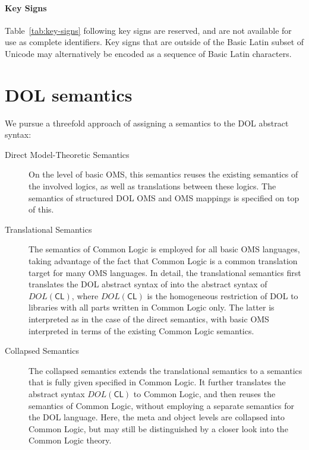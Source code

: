 \documentclass[10pt,%
\ifpretendfinal
final%
\else
draft%
\fi,
]{scrreprt}
\newcommand*{\CL}{\ensuremath{\mathsf{CL}}\xspace}
\newcommand{\clause}[1]{\chapter{#1}}
\newcommand{\sssclause}[1]{\subsubsection{#1}}
\begin{document}
\sssclause{Key Signs}

Table~\ref{tab:key-signs} following key signs are reserved, and are not available for use as complete identifiers.  Key signs that are outside of the Basic Latin subset of Unicode may alternatively be encoded as a sequence of Basic Latin characters.


\clause{DOL semantics}\label{c:semantics}

We pursue a threefold approach of assigning a semantics to the DOL
abstract syntax:

\begin{description}
\item[Direct Model-Theoretic Semantics] On the level of basic
  OMS, this semantics reuses the existing semantics of the
  involved logics, as well as translations between these logics.  The
  semantics of structured DOL OMS and OMS mappings is specified on
  top of this.
\item[Translational Semantics] The semantics of Common Logic is
  employed for all basic OMS languages, taking advantage of the
  fact that Common Logic is a common translation target for many
  OMS languages.  In detail, the translational semantics first
  translates the DOL abstract syntax of into the abstract syntax of
  $DOL(\CL)$, where $DOL(\CL)$ is the homogeneous restriction of DOL
  to libraries with all parts written in Common Logic
  only.  The latter is interpreted as in the case of the direct
  semantics, with basic OMS interpreted in terms of the
  existing Common Logic semantics.
\item[Collapsed Semantics] The collapsed semantics extends the
  translational semantics to a semantics that is fully given specified
  in Common Logic.  It further translates the abstract syntax
  $DOL(\CL)$ to Common Logic, and then reuses the semantics of Common
  Logic, without employing a separate semantics for the DOL language.
  Here, the meta and object levels are collapsed into Common Logic,
  but may still be distinguished by a closer look into the Common
  Logic theory.

\end{description}
\end{document}

